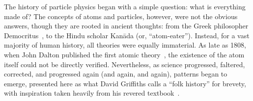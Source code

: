 \begin{dissertationintroduction}
The history of particle physics began with a simple question: what is everything made of? 
The concepts of atoms and particles, however, were not the obvious answers, though they are rooted in ancient thoughts: from the Greek philosopher Democritus~\cite{Taylor1419554}, to the Hindu scholar Kan\=ada (or, ``atom-eater''). %
Instead, for a vast majority of human history, all theories were equally immaterial. 
As late as 1808, when John Dalton published the first\footnotemark{} atomic theory~\cite{Dalton1805, Dalton1808}, the existence of the atom itself could not be directly verified. 
Nevertheless, as science progressed, faltered, corrected, and progressed again (and again, and again), patterns began to emerge, presented here as what David Griffiths calls a ``folk history'' for brevety, with inspiration taken heavily from his revered textbook~\cite{Griffiths}.  


\end{dissertationintroduction}
